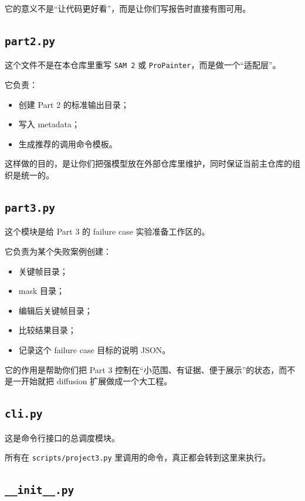\documentclass[11pt,a4paper,fontset=none]{ctexart}
\begin{document}
它的意义不是“让代码更好看”，而是让你们写报告时直接有图可用。

\subsection{\texttt{part2.py}}

这个文件不是在本仓库里重写 \texttt{SAM 2} 或 \texttt{ProPainter}，而是做一个“适配层”。

它负责：

\begin{itemize}
  \item 创建 Part 2 的标准输出目录；
  \item 写入 metadata；
  \item 生成推荐的调用命令模板。
\end{itemize}

这样做的目的，是让你们把强模型放在外部仓库里维护，同时保证当前主仓库的组织是统一的。

\subsection{\texttt{part3.py}}

这个模块是给 Part 3 的 failure case 实验准备工作区的。

它负责为某个失败案例创建：

\begin{itemize}
  \item 关键帧目录；
  \item mask 目录；
  \item 编辑后关键帧目录；
  \item 比较结果目录；
  \item 记录这个 failure case 目标的说明 JSON。
\end{itemize}

它的作用是帮助你们把 Part 3 控制在“小范围、有证据、便于展示”的状态，而不是一开始就把 diffusion 扩展做成一个大工程。

\subsection{\texttt{cli.py}}

这是命令行接口的总调度模块。

所有在 \texttt{scripts/project3.py} 里调用的命令，真正都会转到这里来执行。

\subsection{\texttt{\_\_init\_\_.py}}
\end{document}
